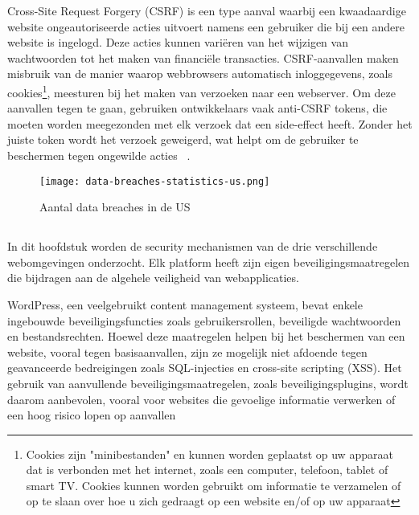 \subsubsection{}
\label{sec:brute force aanvallen}
Cross-Site Request Forgery (CSRF) is een type aanval waarbij een kwaadaardige website ongeautoriseerde acties uitvoert namens een gebruiker die bij een andere website is 
ingelogd. Deze acties kunnen variëren van het wijzigen van wachtwoorden tot het maken van financiële transacties. CSRF-aanvallen maken misbruik van de manier waarop 
webbrowsers automatisch inloggegevens, zoals cookies\footnote{Cookies zijn "minibestanden" en kunnen worden geplaatst op uw apparaat dat is verbonden met het internet, 
zoals een computer, telefoon, tablet of smart TV. Cookies kunnen worden gebruikt om informatie te verzamelen of op te slaan over hoe u zich gedraagt op een website 
en/of op uw apparaat}, meesturen bij het maken van verzoeken naar een webserver. Om deze aanvallen tegen te gaan, gebruiken ontwikkelaars 
vaak anti-CSRF tokens, die moeten worden meegezonden met elk verzoek dat een side-effect heeft. Zonder het juiste token wordt het verzoek geweigerd, wat helpt om de 
gebruiker te beschermen tegen ongewilde acties ~\autocite{B.I.2024}.

\begin{figure}
    \centering
    \texttt{[image: data-breaches-statistics-us.png]}
    \caption[Aantal data breaches in de US ]{Aantal data breaches in de US }
    \label{fig:data-breaches}
\end{figure}

\subsection{}
\label{sec:Security mechanismen in Webomgevingen}

In dit hoofdstuk worden de security mechanismen van de drie verschillende webomgevingen onderzocht. Elk platform heeft zijn eigen beveiligingsmaatregelen die bijdragen 
aan de algehele veiligheid van webapplicaties.

WordPress, een veelgebruikt content management systeem, bevat enkele ingebouwde beveiligingsfuncties zoals gebruikersrollen, beveiligde 
wachtwoorden en bestandsrechten. Hoewel deze maatregelen helpen bij het beschermen van een website, vooral tegen basisaanvallen, zijn ze 
mogelijk niet afdoende tegen geavanceerde bedreigingen zoals SQL-injecties en cross-site scripting (XSS). Het gebruik van aanvullende 
beveiligingsmaatregelen, zoals beveiligingsplugins, wordt daarom aanbevolen, vooral voor websites die gevoelige informatie verwerken 
of een hoog risico lopen op aanvallen~\autocite{Trunde2015}

